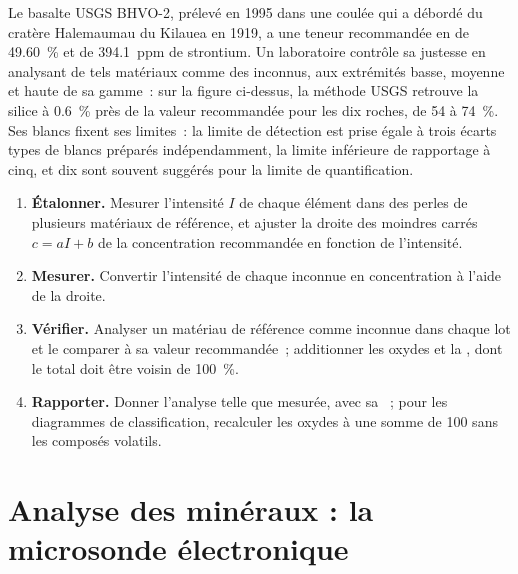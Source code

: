 Le basalte USGS BHVO-2, prélevé en 1995 dans une coulée qui a débordé du cratère Halemaumau du Kilauea en 1919, a une
teneur recommandée en  de \qty{49.60}{\percent} et de \qty{394.1}{ppm} de strontium. Un laboratoire contrôle sa
justesse en analysant de tels matériaux comme des inconnus, aux extrémités basse, moyenne et haute de sa gamme~:
sur la figure ci-dessus, la méthode USGS retrouve la silice à \qty{0.6}{\percent} près de la valeur recommandée pour
les dix roches, de  54 à \qty{74}{\percent}. Ses blancs fixent ses limites~: la limite de détection
est prise égale à trois écarts types de blancs préparés indépendamment, la limite inférieure de rapportage à cinq,
et dix sont souvent suggérés pour la limite
de quantification.

\begin{method}\label{met:b2:field-lab-methods-2:calibration}
\begin{enumerate}
  \item \textbf{Étalonner.} Mesurer l'intensité $I$ de chaque élément dans des perles de plusieurs matériaux de référence,
        et ajuster la droite des moindres carrés $c = aI + b$ de la concentration recommandée
        en fonction de l'intensité.
  \item \textbf{Mesurer.} Convertir l'intensité de chaque inconnue en concentration à l'aide de la droite.
  \item \textbf{Vérifier.} Analyser un matériau de référence comme inconnue dans chaque lot et le comparer à sa
        valeur recommandée~; additionner les oxydes et la , dont le total doit être voisin de
        \qty{100}{\percent}.
  \item \textbf{Rapporter.} Donner l'analyse telle que mesurée, avec sa ~; pour les diagrammes de
        classification, recalculer les oxydes à une somme de 100 sans les composés volatils.
\end{enumerate}
\end{method}

\section{Analyse des minéraux : la microsonde électronique}\label{sec:b2:field-lab-methods-2:microprobe}

